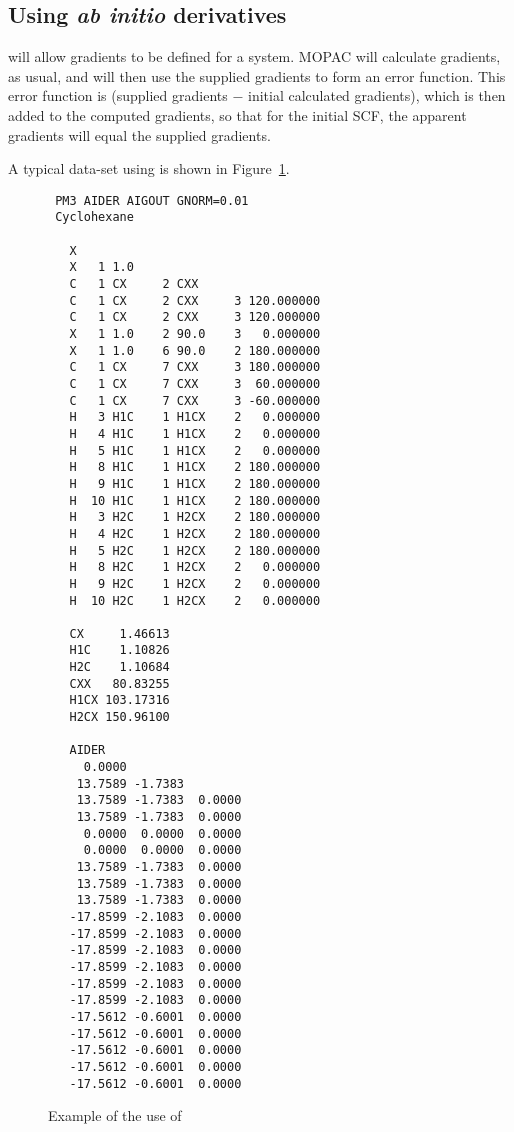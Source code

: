 \subsection{Using  {\em ab initio} derivatives}
 will allow gradients to be defined for a system.  MOPAC  will
calculate  gradients, as usual, and will then use the supplied gradients to
form an error function.  This error function is  (supplied gradients $-$ 
initial  calculated  gradients),  which is then added to the computed
gradients, so that for the initial  SCF,  the  apparent  gradients  will equal
the supplied gradients.

A typical data-set using  is shown in Figure~\ref{aider}.

\begin{figure}
\begin{makeimage}
\end{makeimage}
\compresstable
\begin{verbatim}
 PM3 AIDER AIGOUT GNORM=0.01
 Cyclohexane

   X
   X   1 1.0
   C   1 CX     2 CXX
   C   1 CX     2 CXX     3 120.000000
   C   1 CX     2 CXX     3 120.000000
   X   1 1.0    2 90.0    3   0.000000
   X   1 1.0    6 90.0    2 180.000000
   C   1 CX     7 CXX     3 180.000000
   C   1 CX     7 CXX     3  60.000000
   C   1 CX     7 CXX     3 -60.000000
   H   3 H1C    1 H1CX    2   0.000000
   H   4 H1C    1 H1CX    2   0.000000
   H   5 H1C    1 H1CX    2   0.000000
   H   8 H1C    1 H1CX    2 180.000000
   H   9 H1C    1 H1CX    2 180.000000
   H  10 H1C    1 H1CX    2 180.000000
   H   3 H2C    1 H2CX    2 180.000000
   H   4 H2C    1 H2CX    2 180.000000
   H   5 H2C    1 H2CX    2 180.000000
   H   8 H2C    1 H2CX    2   0.000000
   H   9 H2C    1 H2CX    2   0.000000
   H  10 H2C    1 H2CX    2   0.000000

   CX     1.46613
   H1C    1.10826
   H2C    1.10684
   CXX   80.83255
   H1CX 103.17316
   H2CX 150.96100

   AIDER
     0.0000
    13.7589 -1.7383
    13.7589 -1.7383  0.0000
    13.7589 -1.7383  0.0000
     0.0000  0.0000  0.0000
     0.0000  0.0000  0.0000
    13.7589 -1.7383  0.0000
    13.7589 -1.7383  0.0000
    13.7589 -1.7383  0.0000
   -17.8599 -2.1083  0.0000
   -17.8599 -2.1083  0.0000
   -17.8599 -2.1083  0.0000
   -17.8599 -2.1083  0.0000
   -17.8599 -2.1083  0.0000
   -17.8599 -2.1083  0.0000
   -17.5612 -0.6001  0.0000
   -17.5612 -0.6001  0.0000
   -17.5612 -0.6001  0.0000
   -17.5612 -0.6001  0.0000
   -17.5612 -0.6001  0.0000
\end{verbatim}
\caption{\label{aider} Example of the use of }
\end{figure}
 

